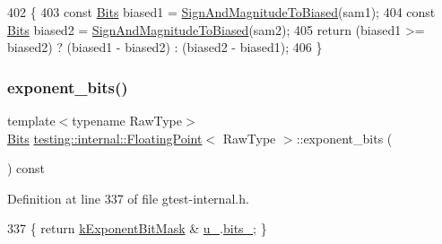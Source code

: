 \begin{DoxyCode}
402                                                                        \{
403     \textcolor{keyword}{const} \hyperlink{classtesting_1_1internal_1_1FloatingPoint_abf228bf6cd48f12c8b44c85b4971a731}{Bits} biased1 = \hyperlink{classtesting_1_1internal_1_1FloatingPoint_a2cf0e39c6ebf026bc0353100d031ca85}{SignAndMagnitudeToBiased}(sam1);
404     \textcolor{keyword}{const} \hyperlink{classtesting_1_1internal_1_1FloatingPoint_abf228bf6cd48f12c8b44c85b4971a731}{Bits} biased2 = \hyperlink{classtesting_1_1internal_1_1FloatingPoint_a2cf0e39c6ebf026bc0353100d031ca85}{SignAndMagnitudeToBiased}(sam2);
405     \textcolor{keywordflow}{return} (biased1 >= biased2) ? (biased1 - biased2) : (biased2 - biased1);
406   \}
\end{DoxyCode}
\mbox{\label{classtesting_1_1internal_1_1FloatingPoint_af6bf8fab8df572ecb137a3516ff390ae}} 
\subsubsection{\texorpdfstring{exponent\+\_\+bits()}{exponent\_bits()}}
{\footnotesize\ttfamily template$<$typename Raw\+Type$>$ \\
\hyperlink{classtesting_1_1internal_1_1FloatingPoint_abf228bf6cd48f12c8b44c85b4971a731}{Bits} \hyperlink{classtesting_1_1internal_1_1FloatingPoint}{testing\+::internal\+::\+Floating\+Point}$<$ Raw\+Type $>$\+::exponent\+\_\+bits (\begin{DoxyParamCaption}{ }\end{DoxyParamCaption}) const\hspace{0.3cm}{\ttfamily [inline]}}



Definition at line 337 of file gtest-\/internal.\+h.


\begin{DoxyCode}
337 \{ \textcolor{keywordflow}{return} \hyperlink{classtesting_1_1internal_1_1FloatingPoint_a66065dfc4d5f41100f686159637af23b}{kExponentBitMask} & \hyperlink{classtesting_1_1internal_1_1FloatingPoint_a2e0b6bd427248b91476f3fca281f7104}{u\_}.\hyperlink{uniontesting_1_1internal_1_1FloatingPoint_1_1FloatingPointUnion_aedb69e386f5d624a016f7a781302a2bf}{bits\_}; \}
\end{DoxyCode}
\mbox{\label{classtesting_1_1internal_1_1FloatingPoint_aa17337e50a2ac855719bc0676529558f}} 
